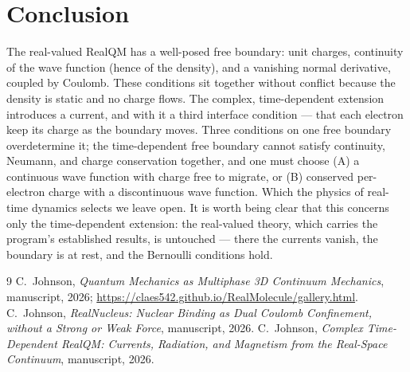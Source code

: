 \documentclass[11pt]{article}
\begin{document}
\section{Conclusion}
\label{sec:concl}

The real-valued RealQM has a well-posed free boundary: unit charges, continuity of the wave function (hence
of the density), and a vanishing normal derivative, coupled by Coulomb. These conditions sit together
without conflict because the density is static and no charge flows. The complex, time-dependent extension
introduces a current, and with it a third interface condition --- that each electron keep its charge as the
boundary moves. Three conditions on one free boundary overdetermine it; the time-dependent free boundary
cannot satisfy continuity, Neumann, and charge conservation together, and one must choose (A) a continuous
wave function with charge free to migrate, or (B) conserved per-electron charge with a discontinuous wave
function. Which the physics of real-time dynamics selects we leave open. It is worth being clear that this
concerns only the time-dependent extension: the real-valued theory, which carries the program's established
results, is untouched --- there the currents vanish, the boundary is at rest, and the Bernoulli conditions
hold.

\begin{thebibliography}{9}
 C.~Johnson, \emph{Quantum Mechanics as Multiphase 3D Continuum Mechanics}, manuscript,
2026; \url{https://claes542.github.io/RealMolecule/gallery.html}.
 C.~Johnson, \emph{RealNucleus: Nuclear Binding as Dual Coulomb Confinement, without a
Strong or Weak Force}, manuscript, 2026.
 C.~Johnson, \emph{Complex Time-Dependent RealQM: Currents, Radiation, and Magnetism
from the Real-Space Continuum}, manuscript, 2026.
\end{thebibliography}
\end{document}
